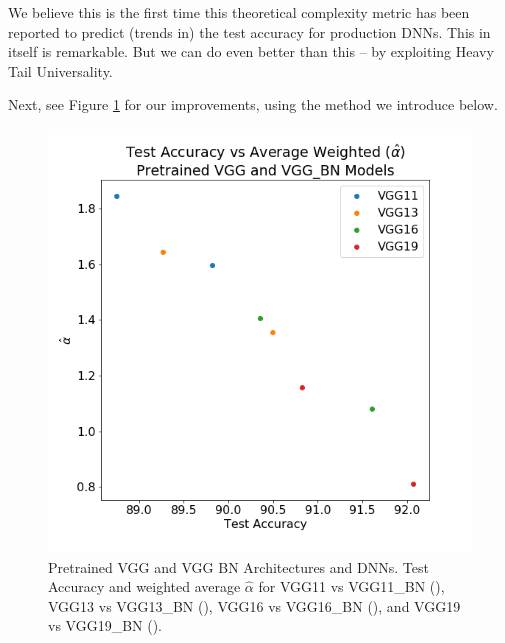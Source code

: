We believe this is the first time this theoretical complexity metric has been reported to predict (trends in) the test accuracy for production
DNNs.  This in itself is remarkable.  But we can do even better than this -- by exploiting Heavy Tail Universality.


Next, see Figure \ref{fig:vgg_alphahat} for our improvements, using the method we introduce below.

\begin{figure}[!htb]
 \centering
   \includegraphics[scale=0.40]{img/vgg-w_alphas.png}
   \caption{
Pretrained VGG and VGG BN Architectures and DNNs.  Test Accuracy and weighted average $\hat{\alpha}$ for
 VGG11 vs VGG11\_BN ({\color{blue}{blue}}),
VGG13 vs VGG13\_BN ({\color{orange}{orange}}),
VGG16 vs VGG16\_BN ({\color{green}{green}}),  and
VGG19 vs VGG19\_BN ({\color{red}{red}}). 
}
  \label{fig:vgg_alphahat}
\end{figure}

